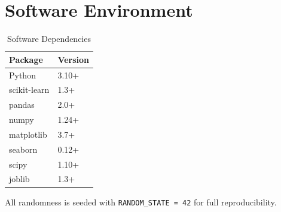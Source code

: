 \documentclass[conference]{IEEEtran}
\begin{document}
\section{Software Environment}
\label{app:env}

\begin{table}[H]
\centering
\caption{Software Dependencies}
\label{tab:software}
\begin{tabular}{@{}ll@{}}
\toprule
\textbf{Package} & \textbf{Version} \\
\midrule
Python       & 3.10+ \\
scikit-learn & 1.3+ \\
pandas       & 2.0+ \\
numpy        & 1.24+ \\
matplotlib   & 3.7+ \\
seaborn      & 0.12+ \\
scipy        & 1.10+ \\
joblib       & 1.3+ \\
\bottomrule
\end{tabular}
\end{table}

All randomness is seeded with \texttt{RANDOM\_STATE = 42} for full reproducibility.
\end{document}
